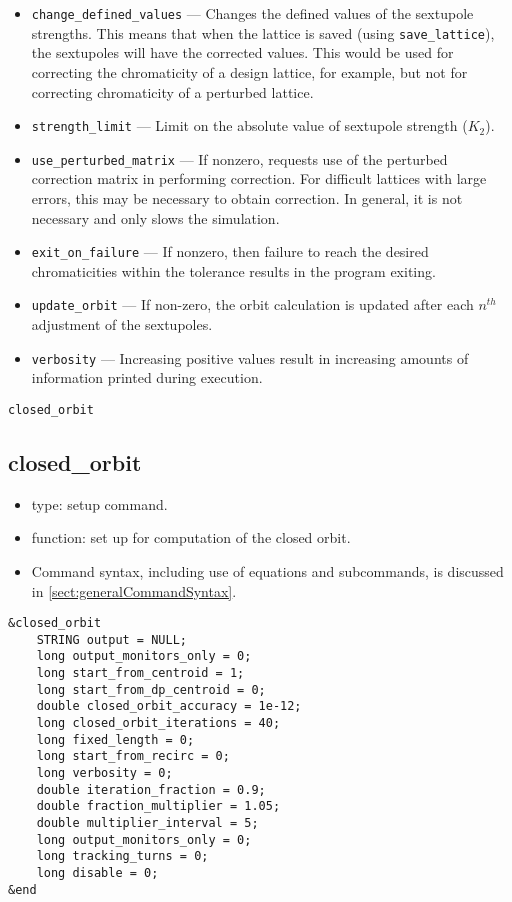 \documentclass[11pt]{article}
\begin{document}
\begin{itemize}
\item \verb|change_defined_values| --- Changes the defined values of the sextupole strengths.
This means that when the lattice is saved (using \verb|save_lattice|), the sextupoles will
have the corrected values.  This would be used for correcting the chromaticity of a design
lattice, for example, but not for correcting chromaticity of a perturbed lattice.
\item \verb|strength_limit| --- Limit on the absolute value of sextupole strength ($K_2$).
\item \verb|use_perturbed_matrix| --- If nonzero, requests use of the perturbed correction matrix in
performing correction.  For difficult lattices with large errors, this may be necessary
to obtain correction.  In general, it is not necessary and only slows the simulation.
\item \verb|exit_on_failure| --- If nonzero, then failure to reach the desired chromaticities within the
  tolerance results in the program exiting.
\item \verb|update_orbit| --- If non-zero, the orbit calculation is updated after each $n^{th}$ adjustment of the
  sextupoles.
\item \verb|verbosity| --- Increasing positive values result in increasing amounts of information printed during
  execution.
\end{itemize}

\newpage
\begin{center}{\Large\verb|closed_orbit|}\end{center}
\subsection{closed\_orbit \label{subsec:closedorbit}}

\begin{itemize}
\item type: setup command.
\item function: set up for computation of the closed orbit.
\item Command syntax, including use of equations and subcommands, is discussed in \ref{sect:generalCommandSyntax}.
\end{itemize}

\begin{verbatim}
&closed_orbit
    STRING output = NULL;
    long output_monitors_only = 0;
    long start_from_centroid = 1;
    long start_from_dp_centroid = 0;
    double closed_orbit_accuracy = 1e-12;
    long closed_orbit_iterations = 40;
    long fixed_length = 0;
    long start_from_recirc = 0;
    long verbosity = 0;
    double iteration_fraction = 0.9;
    double fraction_multiplier = 1.05;
    double multiplier_interval = 5;
    long output_monitors_only = 0;
    long tracking_turns = 0;
    long disable = 0;
&end
\end{verbatim}
\end{document}
